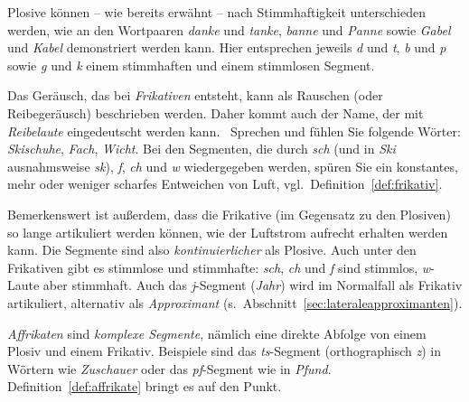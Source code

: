 
Plosive können -- wie bereits erwähnt -- nach Stimmhaftigkeit unterschieden werden, wie an den Wortpaaren \textit{danke} und \textit{tanke}, \textit{banne} und \textit{Panne} sowie \textit{Gabel} und \textit{Kabel} demonstriert werden kann.
Hier entsprechen jeweils \textit{d} und \textit{t}, \textit{b} und \textit{p} sowie \textit{g} und \textit{k} einem stimmhaften und einem stimmlosen Segment.

Das Geräusch, das bei \textit{Frikativen} entsteht, kann als Rauschen (oder Reibegeräusch) beschrieben werden.
Daher kommt auch der Name, der mit \textit{Reibelaute} eingedeutscht werden kann.
\TuBegin~Sprechen und fühlen Sie folgende Wörter: \textit{Skischuhe}, \textit{Fach}, \textit{Wicht}.
Bei den Segmenten, die durch \textit{sch} (und in \textit{Ski} ausnahmsweise \textit{sk}), \textit{f}, \textit{ch} und \textit{w} wiedergegeben werden, spüren Sie ein konstantes, mehr oder weniger scharfes Entweichen von Luft, vgl.\ Definition~\ref{def:frikativ}.


Bemerkenswert ist außerdem, dass die Frikative (im Gegensatz zu den Plosiven) so lange artikuliert werden können, wie der Luftstrom aufrecht erhalten werden kann.
Die Segmente sind also \textit{kontinuierlicher} als Plosive.
Auch unter den Frikativen gibt es stimmlose und stimmhafte: \textit{sch}, \textit{ch} und \textit{f} sind stimmlos, \textit{w}-Laute aber \zB stimmhaft.
Auch das \textit{j}-Segment (\textit{Jahr}) wird im Normalfall als Frikativ artikuliert, alternativ als \textit{Approximant} (s.\ Abschnitt~\ref{sec:lateraleapproximanten}).

\textit{Affrikaten} sind \textit{komplexe Segmente}, nämlich eine direkte Abfolge von einem Plosiv und einem Frikativ.
Beispiele sind das \textit{ts}-Segment (orthographisch \textit{z}) in Wörtern wie \textit{Zuschauer} oder das \textit{pf}-Segment wie in \textit{Pfund}.
Definition~\ref{def:affrikate} bringt es auf den Punkt.


